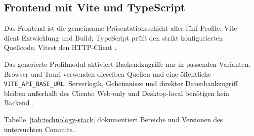 \subsection{Frontend mit Vite und TypeScript}
\label{subsec:frontend-vite-typescript}

Das Frontend ist die gemeinsame Präsentationsschicht aller fünf Profile. Vite
dient Entwicklung und Build; TypeScript prüft den strikt konfigurierten
Quellcode, Vitest den HTTP-Client
\parencite{vite2026guide,typescript2026handbook}.

Das generierte Profilmodul aktiviert Backendzugriffe nur in passenden
Varianten. Browser und Tauri verwenden dieselben Quellen und eine öffentliche
\texttt{VITE\_API\_BASE\_URL}. Serverlogik, Geheimnisse und direkter
Datenbankzugriff bleiben außerhalb des Clients; Web-only und Desktop-local
benötigen kein Backend
\parencite{kleiveist2026architecture,kleiveist2026profiles}.

Tabelle~\ref{tab:technology-stack} dokumentiert Bereiche und Versionen des
untersuchten Commits.


